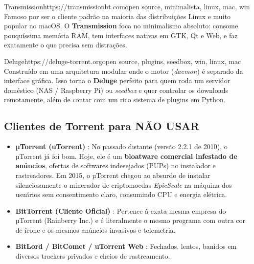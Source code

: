 \documentclass{pousadaguide}
\begin{document}
\begin{ferramenta}[recomendado,logo=transmission]{Transmission}{https://transmissionbt.com}{open source, minimalista, linux, mac, win}
Famoso por ser o cliente padrão na maioria das distribuições Linux e muito popular no macOS. O \textbf{Transmission} foca no minimalismo absoluto: consome pouquíssima memória RAM, tem interfaces nativas em GTK, Qt e Web, e faz exatamente o que precisa sem distrações. 
\end{ferramenta}

\begin{ferramenta}[recomendado,logo=deluge]{Deluge}{https://deluge-torrent.org}{open source, plugins, seedbox, win, linux, mac}
Construído em uma arquitetura modular onde o motor (\emph{daemon}) é separado da interface gráfica. Isso torna o \textbf{Deluge} perfeito para quem roda um servidor doméstico (NAS / Raspberry Pi) ou \emph{seedbox} e quer controlar os downloads remotamente, além de contar com um rico sistema de plugins em Python. 
\end{ferramenta}

\subsection{Clientes de Torrent para NÃO USAR}

\begin{perigo}
\begin{itemize}
  \item \textbf{µTorrent (uTorrent)} : No passado distante (versão 2.2.1 de 2010), o µTorrent já foi bom. Hoje, ele é um \textbf{bloatware comercial infestado de anúncios}, ofertas de softwares indesejados (PUPs) no instalador e rastreadores. Em 2015, o µTorrent chegou ao absurdo de instalar silenciosamente o minerador de criptomoedas \emph{EpicScale} na máquina dos usuários sem consentimento claro, consumindo CPU e energia elétrica.
  \item \textbf{BitTorrent (Cliente Oficial)} : Pertence à exata mesma empresa do µTorrent (Rainberry Inc.) e é literalmente o mesmo programa com outra cor de ícone e os mesmos anúncios invasivos e telemetria.
  \item \textbf{BitLord / BitComet / uTorrent Web} : Fechados, lentos, banidos em diversos trackers privados e cheios de rastreamento.
\end{itemize}
\end{perigo}
\end{document}
